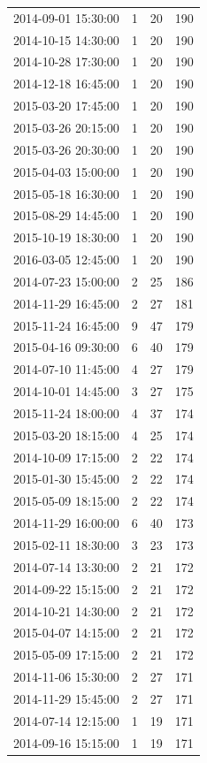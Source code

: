 \begin{tabular}{lrrr}
2014-09-01 15:30:00 & 1 & 20 & 190 \\
2014-10-15 14:30:00 & 1 & 20 & 190 \\
2014-10-28 17:30:00 & 1 & 20 & 190 \\
2014-12-18 16:45:00 & 1 & 20 & 190 \\
2015-03-20 17:45:00 & 1 & 20 & 190 \\
2015-03-26 20:15:00 & 1 & 20 & 190 \\
2015-03-26 20:30:00 & 1 & 20 & 190 \\
2015-04-03 15:00:00 & 1 & 20 & 190 \\
2015-05-18 16:30:00 & 1 & 20 & 190 \\
2015-08-29 14:45:00 & 1 & 20 & 190 \\
2015-10-19 18:30:00 & 1 & 20 & 190 \\
2016-03-05 12:45:00 & 1 & 20 & 190 \\
2014-07-23 15:00:00 & 2 & 25 & 186 \\
2014-11-29 16:45:00 & 2 & 27 & 181 \\
2015-11-24 16:45:00 & 9 & 47 & 179 \\
2015-04-16 09:30:00 & 6 & 40 & 179 \\
2014-07-10 11:45:00 & 4 & 27 & 179 \\
2014-10-01 14:45:00 & 3 & 27 & 175 \\
2015-11-24 18:00:00 & 4 & 37 & 174 \\
2015-03-20 18:15:00 & 4 & 25 & 174 \\
2014-10-09 17:15:00 & 2 & 22 & 174 \\
2015-01-30 15:45:00 & 2 & 22 & 174 \\
2015-05-09 18:15:00 & 2 & 22 & 174 \\
2014-11-29 16:00:00 & 6 & 40 & 173 \\
2015-02-11 18:30:00 & 3 & 23 & 173 \\
2014-07-14 13:30:00 & 2 & 21 & 172 \\
2014-09-22 15:15:00 & 2 & 21 & 172 \\
2014-10-21 14:30:00 & 2 & 21 & 172 \\
2015-04-07 14:15:00 & 2 & 21 & 172 \\
2015-05-09 17:15:00 & 2 & 21 & 172 \\
2014-11-06 15:30:00 & 2 & 27 & 171 \\
2014-11-29 15:45:00 & 2 & 27 & 171 \\
2014-07-14 12:15:00 & 1 & 19 & 171 \\
2014-09-16 15:15:00 & 1 & 19 & 171 \\

\end{tabular}
